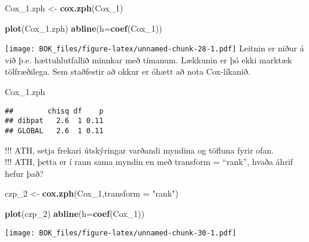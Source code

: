 \documentclass[
]{book}
\newenvironment{Shaded}{\begin{snugshade}}{\end{snugshade}}
\newcommand{\DataTypeTok}[1]{\textcolor[rgb]{0.13,0.29,0.53}{#1}}
\newcommand{\DecValTok}[1]{\textcolor[rgb]{0.00,0.00,0.81}{#1}}
\newcommand{\FloatTok}[1]{\textcolor[rgb]{0.00,0.00,0.81}{#1}}
\newcommand{\KeywordTok}[1]{\textcolor[rgb]{0.13,0.29,0.53}{\textbf{#1}}}
\newcommand{\NormalTok}[1]{#1}
\newcommand{\StringTok}[1]{\textcolor[rgb]{0.31,0.60,0.02}{#1}}
\begin{document}
\begin{Shaded}
\begin{Highlighting}[]
\NormalTok{Cox_}\FloatTok{1.}\NormalTok{zph <-}\StringTok{ }\KeywordTok{cox.zph}\NormalTok{(Cox_}\DecValTok{1}\NormalTok{)}
\end{Highlighting}
\end{Shaded}

\begin{Shaded}
\begin{Highlighting}[]
\KeywordTok{plot}\NormalTok{(Cox_}\FloatTok{1.}\NormalTok{zph)}
\KeywordTok{abline}\NormalTok{(}\DataTypeTok{h=}\KeywordTok{coef}\NormalTok{(Cox_}\DecValTok{1}\NormalTok{))}
\end{Highlighting}
\end{Shaded}

\texttt{[image: BOK\_files/figure-latex/unnamed-chunk-28-1.pdf]}
Leitnin er niður á við þ.e. hættuhlutfallið minnkar með tímanum. Lækkunin er þó ekki marktæk tölfræðilega. Sem staðfestir að okkur er óhætt að nota Cox-líkanið.

\begin{Shaded}
\begin{Highlighting}[]
\NormalTok{Cox_}\FloatTok{1.}\NormalTok{zph}
\end{Highlighting}
\end{Shaded}

\begin{verbatim}
##        chisq df    p
## dibpat   2.6  1 0.11
## GLOBAL   2.6  1 0.11
\end{verbatim}

!!! ATH, setja frekari útskýringar varðandi myndina og töfluna fyrir ofan.\\
!!! ATH, þetta er í raun sama myndin en með transform = ``rank'', hvaða áhrif hefur það?

\begin{Shaded}
\begin{Highlighting}[]
\NormalTok{czp_}\DecValTok{2}\NormalTok{ <-}\StringTok{ }\KeywordTok{cox.zph}\NormalTok{(Cox_}\DecValTok{1}\NormalTok{,}\DataTypeTok{transform =} \StringTok{"rank"}\NormalTok{)}

\KeywordTok{plot}\NormalTok{(czp_}\DecValTok{2}\NormalTok{)}
\KeywordTok{abline}\NormalTok{(}\DataTypeTok{h=}\KeywordTok{coef}\NormalTok{(Cox_}\DecValTok{1}\NormalTok{))}
\end{Highlighting}
\end{Shaded}

\texttt{[image: BOK\_files/figure-latex/unnamed-chunk-30-1.pdf]}
\end{document}
